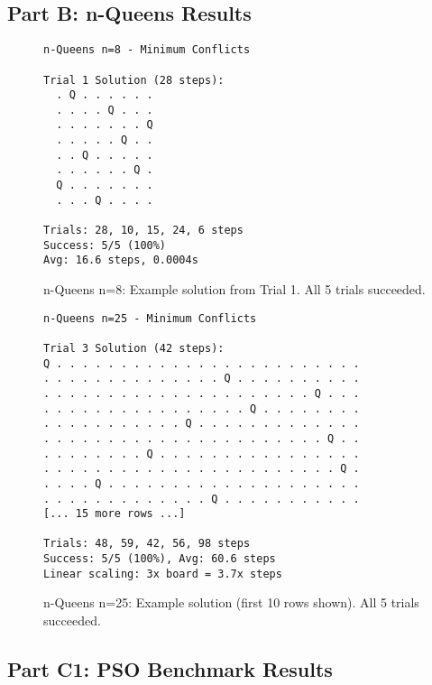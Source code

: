 \documentclass[letterpaper]{article}
\begin{document}
\subsection{Part B: n-Queens Results}

\begin{figure}[h]
\begin{scriptsize}
\begin{verbatim}
n-Queens n=8 - Minimum Conflicts

Trial 1 Solution (28 steps):
  . Q . . . . . .
  . . . . Q . . .
  . . . . . . . Q
  . . . . . Q . .
  . . Q . . . . .
  . . . . . . Q .
  Q . . . . . . .
  . . . Q . . . .

Trials: 28, 10, 15, 24, 6 steps
Success: 5/5 (100%)
Avg: 16.6 steps, 0.0004s
\end{verbatim}
\end{scriptsize}
\caption{n-Queens n=8: Example solution from Trial 1. All 5 trials succeeded.}
\label{fig:nqueens-8}
\end{figure}

\begin{figure}[h]
\begin{scriptsize}
\begin{verbatim}
n-Queens n=25 - Minimum Conflicts

Trial 3 Solution (42 steps):
Q . . . . . . . . . . . . . . . . . . . . . . . .
. . . . . . . . . . . . . . Q . . . . . . . . . .
. . . . . . . . . . . . . . . . . . . . . Q . . .
. . . . . . . . . . . . . . . . Q . . . . . . . .
. . . . . . . . . . . Q . . . . . . . . . . . . .
. . . . . . . . . . . . . . . . . . . . . . Q . .
. . . . . . . . Q . . . . . . . . . . . . . . . .
. . . . . . . . . . . . . . . . . . . . . . . Q .
. . . . Q . . . . . . . . . . . . . . . . . . . .
. . . . . . . . . . . . . Q . . . . . . . . . . .
[... 15 more rows ...]

Trials: 48, 59, 42, 56, 98 steps
Success: 5/5 (100%), Avg: 60.6 steps
Linear scaling: 3x board = 3.7x steps
\end{verbatim}
\end{scriptsize}
\caption{n-Queens n=25: Example solution (first 10 rows shown). All 5 trials succeeded.}
\label{fig:nqueens-25}
\end{figure}

\subsection{Part C1: PSO Benchmark Results}
\end{document}
